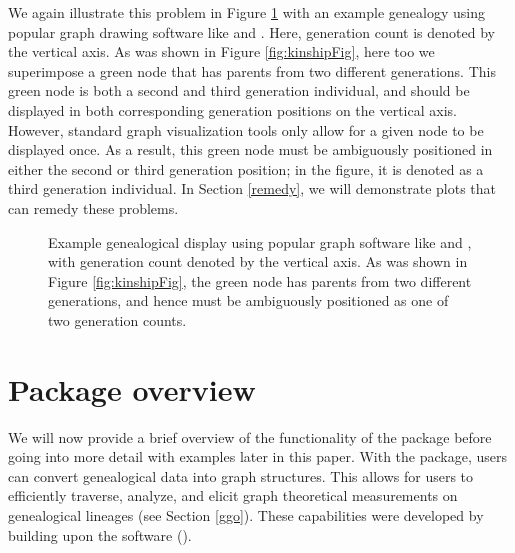 \documentclass[article,shortnames]{jss}
\begin{document}
We again illustrate this problem in Figure \ref{fig:Graph} with an example genealogy using popular graph drawing software like  and . Here, generation count is denoted by the vertical axis. As was shown in Figure \ref{fig:kinshipFig}, here too we superimpose a green node that has parents from two different generations. This green node is both a second and third generation individual, and should be displayed in both corresponding generation positions on the vertical axis. However, standard graph visualization tools only allow for a given node to be displayed once. As a result, this green node must be ambiguously positioned in either the second or third generation position; in the figure, it is denoted as a third generation individual. In Section \ref{remedy}, we will demonstrate  plots that can remedy these problems.

\begin{figure}[H]
    \centering
    \caption{Example genealogical display using popular graph software like  and , with generation count denoted by the vertical axis. As was shown in Figure \ref{fig:kinshipFig}, the green node has parents from two different generations, and hence must be ambiguously positioned as one of two generation counts.}
    \label{fig:Graph}
\end{figure}

\section{Package overview}

We will now provide a brief overview of the functionality of the  package before going into more detail with examples later in this paper. With the  package, users can convert genealogical data into graph structures. This allows for users to efficiently traverse, analyze, and elicit graph theoretical measurements on genealogical lineages (see Section \ref{ggo}). These capabilities were developed by building upon the  software (\citealt{igraph}).
\end{document}
